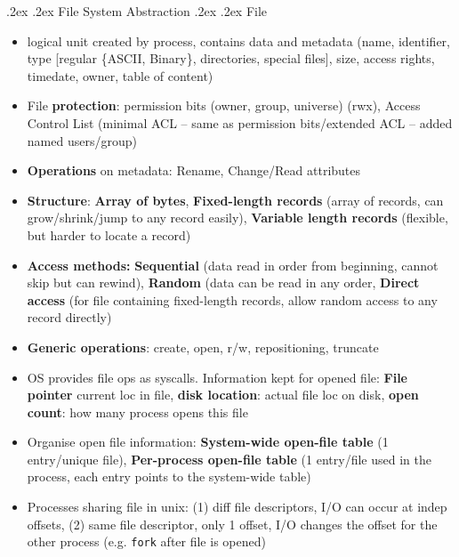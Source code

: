 \documentclass[10pt,landscape,a4paper]{article}
\makeatletter
\renewcommand{\subsection}{\@startsection{subsection}{1}{0mm}%
  {.2ex}%
  {.2ex}%
{\sffamily\bfseries}}
\renewcommand{\subsubsection}{\@startsection{subsubsection}{1}{0mm}%
  {.2ex}%
  {.2ex}%
{\rmfamily\bfseries}}
\makeatother
\begin{document}
\begin{multicols*}{4}
  \subsection{File System Abstraction}
  \subsubsection{File}
  \begin{itemize}
    \item logical unit created by process, contains data and metadata (name, identifier, type [regular \{ASCII, Binary\}, directories, special files], size, access rights, timedate, owner, table of content)
    \item File \textbf{protection}: permission bits (owner, group, universe) (rwx), Access Control List (minimal ACL -- same as permission bits/extended ACL -- added named users/group)
    \item \textbf{Operations} on metadata: Rename, Change/Read attributes
    \item \textbf{Structure}: \textbf{Array of bytes}, \textbf{Fixed-length records} (array of records, can grow/shrink/jump to any record easily), \textbf{Variable length records} (flexible, but harder to locate a record)
    \item \textbf{Access methods:} \textbf{Sequential} (data read in order from beginning, cannot skip but can rewind), \textbf{Random} (data can be read in any order, \textbf{Direct access} (for file containing fixed-length records, allow random access to any record directly)
    \item \textbf{Generic operations}: create, open, r/w, repositioning, truncate
    \item OS provides file ops as syscalls. Information kept for opened file: \textbf{File pointer} current loc in file, \textbf{disk location}: actual file loc on disk, \textbf{open count}: how many process opens this file
    \item Organise open file information: \textbf{System-wide open-file table} (1 entry/unique file), \textbf{Per-process open-file table} (1 entry/file used in the process, each entry points to the system-wide table)
    \item Processes sharing file in unix: (1) diff file descriptors, I/O can occur at indep offsets, (2) same file descriptor, only 1 offset, I/O changes the offset for the other process (e.g. \texttt{fork} after file is opened)
  \end{itemize}

\end{multicols*}
\end{document}

